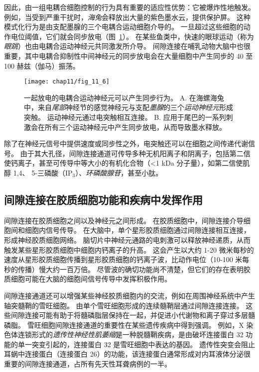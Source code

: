 因此，由一组电耦合细胞控制的行为具有重要的适应性优势：它被爆炸性地触发。
例如，当受到严重干扰时，\textit{海兔}会释放出大量的紫色墨水云，提供保护屏。
这种模式化行为是由支配墨腺的三个电耦合运动细胞介导的。
一旦超过这些细胞的动作电位阈值，它们就会同步放电（图~\ref{fig:11_6}）。
在某些鱼类中，快速的眼球运动（称为\textit{眼跳}）也由电耦合运动神经元共同激发所介导。
间隙连接在哺乳动物大脑中也很重要，其中电耦合抑制性中间神经元的同步放电会在大量细胞中产生同步的 40 至 100 赫兹（伽马）振荡。


\begin{figure}[htbp]
	\centering
	\texttt{[image: chap11/fig\_11\_6]}
	\caption{一起放电的电耦合运动神经元可以产生同步行为\cite{carew1976two}。 
		A. 在海螺海兔中，来自\textit{尾部}神经节的感觉神经元与支配\textit{墨腺}的三个\textit{运动神经元}形成突触。
		运动神经元通过电突触相互连接。
		B. 应用于尾巴的一系列刺激会在所有三个运动神经元中产生同步放电，从而导致墨水释放。}
	\label{fig:11_6}
\end{figure}


除了在神经元信号中提供速度或同步性之外，电突触还可以在细胞之间传递代谢信号。
由于其大孔径，间隙连接通道可传导多种无机阳离子和阴离子，包括第二信使钙离子，甚至可传导中等大小的有机化合物（<1 kDa 分子量），如第二信使肌醇 1,4、 5-三磷酸（IP$_3$）、\textit{环磷酸腺苷}，甚至小肽。



\subsection{间隙连接在胶质细胞功能和疾病中发挥作用}

间隙连接在胶质细胞之间以及神经元之间形成。
在胶质细胞中，间隙连接介导细胞间和细胞内信号传导。 
在大脑中，单个星形胶质细胞通过间隙连接相互连接，形成神经胶质细胞网络。
脑切片中神经元通路的电刺激可以释放神经递质，从而触发某些星形胶质细胞中细胞内钙离子的升高。
这会产生以大约 1-20 微米每秒的速度从星形胶质细胞传播到星形胶质细胞的钙离子波，比动作电位（10-100 米每秒的传播）慢大约一百万倍。
尽管波的确切功能尚不清楚，但它们的存在表明胶质细胞可能在大脑的细胞间信号传导中发挥积极作用。


间隙连接通道还可以增强某些神经胶质细胞内的交流，例如在周围神经系统中产生轴突髓鞘的雪旺细胞。
由单个雪旺细胞形成的连续髓鞘层通过间隙连接连接。
这些间隙连接可能有助于将髓磷脂层保持在一起，并促进小代谢物和离子穿过多层髓磷脂。
雪旺细胞间隙连接通道的重要性在某些遗传疾病中得到强调。
例如，X 染色体连锁形式的\textit{遗传性神经性肌萎缩}是一种脱髓鞘疾病，是由破坏连接蛋白 32 功能的单一突变引起的，连接蛋白 32 是雪旺细胞中表达的基因。
遗传性突变会阻止耳蜗中连接蛋白（连接蛋白 26）的功能，该连接蛋白通常形成对内耳液体分泌很重要的间隙连接通道，占所有先天性耳聋病例的一半。



